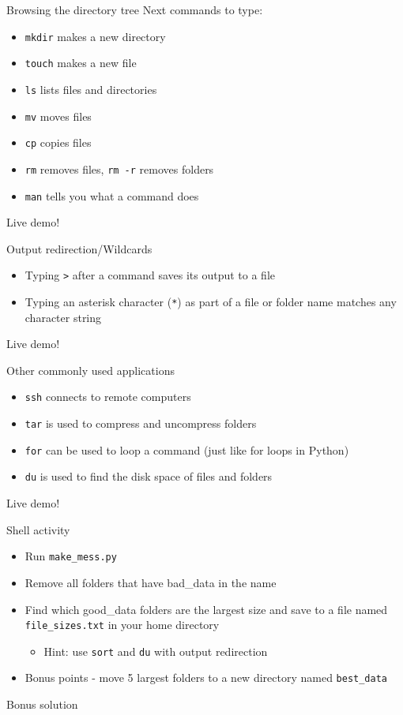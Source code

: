 \begin{frame}{Browsing the directory tree}
  Next commands to type:
  \begin{itemize}
  \item \texttt{mkdir} makes a new directory
  \item \texttt{touch} makes a new file
  \item \texttt{ls} lists files and directories
  \item \texttt{mv} moves files
  \item \texttt{cp} copies files
  \item \texttt{rm} removes files, \texttt{rm -r} removes folders
  \item \texttt{man} tells you what a command does
  \end{itemize}
  Live demo!
\end{frame}

\begin{frame}{Output redirection/Wildcards}
  \begin{itemize}
  \item Typing \texttt{>} after a command saves its output to a file
  \item Typing an asterisk character (\texttt{*}) as part of a
    file or folder name matches any character string
  \end{itemize}
  Live demo!
\end{frame}

\begin{frame}{Other commonly used applications}
  \begin{itemize}
  \item \texttt{ssh} connects to remote computers
  \item \texttt{tar} is used to compress and uncompress folders
  \item \texttt{for} can be used to loop a command
    (just like for loops in Python)
  \item \texttt{du} is used to find the disk space of files and folders
  \end{itemize}
  Live demo!
\end{frame}

\begin{frame}{Shell activity}
  \begin{itemize}
  \item Run \texttt{make\_mess.py}
    \pause
  \item Remove all folders that have bad\_data in the name
  \item Find which good\_data folders are the largest size and save to
    a file named \texttt{file\_sizes.txt} in your home directory
    \begin{itemize}
    \item Hint: use \texttt{sort} and \texttt{du} with output redirection
    \end{itemize}
  \item Bonus points - move 5 largest folders to a new directory named
    \texttt{best\_data}
  \end{itemize}
\end{frame}

\begin{frame}{Bonus solution}
  \inputminted{bash}{code-snippets/bonus-shell-problem-solution.sh}
\end{frame}
